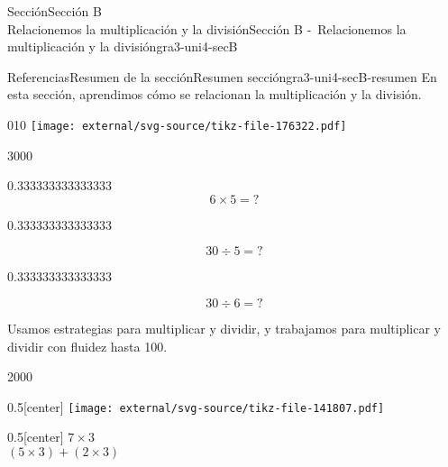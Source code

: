 \begin{sectionptx}{Sección}{{\Large Sección B\\}Relacionemos la multiplicación y la división}{}{Sección B -~Relacionemos la multiplicación y la división}{}{}{gra3-uni4-secB}
\typeout{************************************************}
%
\begin{references-subsection}{Referencias}{Resumen de la sección}{}{Resumen sección}{}{}{gra3-uni4-secB-resumen}
En esta sección, aprendimos cómo se relacionan la multiplicación y la división.%
\begin{image}{0}{1}{0}{}%
\texttt{[image: external/svg-source/tikz-file-176322.pdf]}
\end{image}%
\begin{sidebyside}{3}{0}{0}{0}%
\begin{sbspanel}{0.333333333333333}%
%
\begin{equation*}
6\times 5={?}
\end{equation*}
%
\end{sbspanel}%
\begin{sbspanel}{0.333333333333333}%
\par
%
\begin{equation*}
30\div 5={?}
\end{equation*}
%
\end{sbspanel}%
\begin{sbspanel}{0.333333333333333}%
\par
%
\begin{equation*}
30\div 6={?}
\end{equation*}
%
\end{sbspanel}%
\end{sidebyside}%
\par
Usamos estrategias para multiplicar y dividir, y trabajamos para multiplicar y dividir con fluidez hasta 100.%
\begin{sidebyside}{2}{0}{0}{0}%
\begin{sbspanel}{0.5}[center]%
\texttt{[image: external/svg-source/tikz-file-141807.pdf]}
\end{sbspanel}%
\begin{sbspanel}{0.5}[center]%
\(7\times 3\)\\
 \((5\times3)+(2\times3)\)%
\end{sbspanel}%
\end{sidebyside}%
\end{references-subsection}
\end{sectionptx}
%
%
\typeout{************************************************}
\typeout{************************************************}
%
